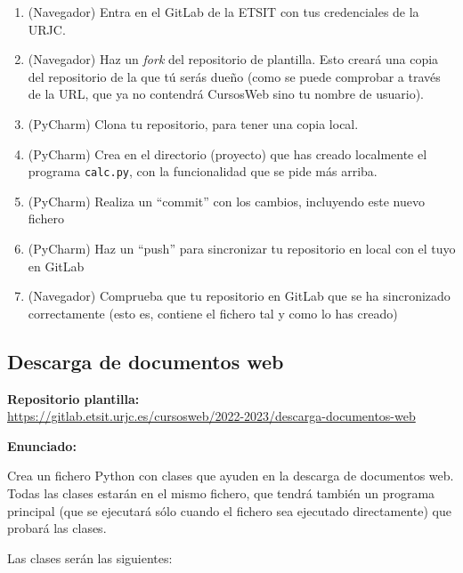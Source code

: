 \begin{enumerate}
  \item (Navegador) Entra en el GitLab de la ETSIT con tus credenciales de la URJC.
  \item (Navegador) Haz un \emph{fork} del repositorio de plantilla. Esto creará una copia del repositorio de la que tú serás dueño (como se puede comprobar a través de la URL, que ya no contendrá CursosWeb sino tu nombre de usuario).
  \item (PyCharm) Clona tu repositorio, para tener una copia local.
  \item (PyCharm) Crea en el directorio (proyecto) que has creado localmente el programa \texttt{calc.py}, con la funcionalidad que se pide más arriba.
  \item (PyCharm) Realiza un ``commit'' con los cambios, incluyendo este nuevo fichero
  \item (PyCharm) Haz un ``push'' para sincronizar tu repositorio en local con el tuyo en GitLab
  \item (Navegador) Comprueba que tu repositorio en GitLab que se ha sincronizado correctamente (esto es, contiene el fichero tal y como lo has creado)
\end{enumerate}


\subsection{Descarga de documentos web}
\label{subsec:eje-python-descarga-web}

\textbf{Repositorio plantilla:} \\
\url{https://gitlab.etsit.urjc.es/cursosweb/2022-2023/descarga-documentos-web}

\textbf{Enunciado:}

Crea un fichero Python con clases que ayuden en la descarga de documentos web. Todas las clases estarán en el mismo fichero, que tendrá también un programa principal (que se ejecutará sólo cuando el fichero sea ejecutado directamente) que probará las clases.

Las clases serán las siguientes:

